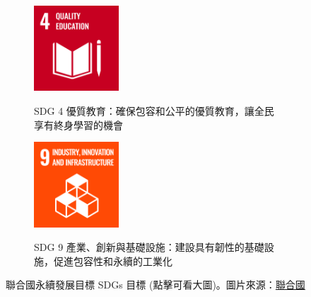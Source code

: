 \documentclass[12pt]{article}
\begin{document}
\begin{figure}[H]
  \centering
  \begin{subfigure}{0.4\linewidth}
    \centering
    \href{https://raw.githubusercontent.com/programingtw/proglearn-plan/main/2023全國大專校院智慧創新暨跨域整合創作競賽/img/E_SDG_PRINT-04.jpg}{ 
      \includegraphics[width=0.35\textwidth]{./img/E_SDG_PRINT-04.jpg}
    }
    \caption{SDG 4 優質教育：確保包容和公平的優質教育，讓全民享有終身學習的機會}
  \end{subfigure}
  \label{arc1}
  \begin{subfigure}{0.4\linewidth}
    \centering
    \href{https://raw.githubusercontent.com/programingtw/proglearn-plan/main/2023全國大專校院智慧創新暨跨域整合創作競賽/img/E_SDG_PRINT-09.jpg}{ 
      \includegraphics[width=0.35\textwidth]{./img/E_SDG_PRINT-09.jpg}
    }
    \caption{SDG 9 產業、創新與基礎設施：建設具有韌性的基礎設施，促進包容性和永續的工業化}
  \end{subfigure}
  \label{arc2}
  \caption{聯合國永續發展目標 SDGs 目標 (點擊可看大圖)。圖片來源：\href{https://www.un.org/sustainabledevelopment/news/communications-material/}{聯合國}}
\end{figure}
\end{document}
